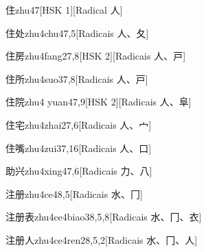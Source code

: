 \begin{entry}{住}{zhu4}{7}[HSK 1][Radical ⼈]
\end{entry}

\begin{entry}{住处}{zhu4chu4}{7,5}[Radicais ⼈、⼡]
\end{entry}

\begin{entry}{住房}{zhu4fang2}{7,8}[HSK 2][Radicais ⼈、⼾]
\end{entry}

\begin{entry}{住所}{zhu4suo3}{7,8}[Radicais ⼈、⼾]
\end{entry}

\begin{entry}{住院}{zhu4 yuan4}{7,9}[HSK 2][Radicais ⼈、⾩]
\end{entry}

\begin{entry}{住宅}{zhu4zhai2}{7,6}[Radicais ⼈、⼧]
\end{entry}

\begin{entry}{住嘴}{zhu4zui3}{7,16}[Radicais ⼈、⼝]
\end{entry}

\begin{entry}{助兴}{zhu4xing4}{7,6}[Radicais ⼒、⼋]
\end{entry}

\begin{entry}{注册}{zhu4ce4}{8,5}[Radicais ⽔、⼌]
\end{entry}

\begin{entry}{注册表}{zhu4ce4biao3}{8,5,8}[Radicais ⽔、⼌、⾐]
\end{entry}

\begin{entry}{注册人}{zhu4ce4ren2}{8,5,2}[Radicais ⽔、⼌、⼈]
\end{entry}

